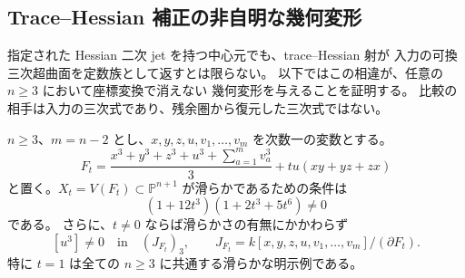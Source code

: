 \subsection{Trace--Hessian 補正の非自明な幾何変形}
\label{sec:trace-geometric-correction}

指定された Hessian 二次 jet を持つ中心元でも、trace--Hessian 射が
入力の可換三次超曲面を定数族として返すとは限らない。
以下ではこの相違が、任意の $n\ge3$ において座標変換で消えない
幾何変形を与えることを証明する。
比較の相手は入力の三次式であり、残余圏から復元した三次式ではない。

\begin{proposition}
\label{prop:trace-uniform-jacobi-class}
$n\ge3$、$m=n-2$ とし、$x,y,z,u,v_1,\ldots,v_m$ を次数一の変数とする。
\begin{equation}\label{eq:trace-test-family}
 F_t=\frac{x^3+y^3+z^3+u^3+\sum_{a=1}^{m}v_a^3}{3}
       +tu(xy+yz+zx)
\end{equation}
と置く。$X_t=V(F_t)\subset\mathbb P^{n+1}$ が滑らかであるための条件は
\begin{equation}\label{eq:trace-test-smooth}
 (1+12t^3)(1+2t^3+5t^6)\ne0
\end{equation}
である。
さらに、$t\ne0$ ならば滑らかさの有無にかかわらず
\begin{equation}\label{eq:trace-u-cube-nonzero}
 [u^3]\ne0\quad\text{in}\quad
 (J_{F_t})_3,
 \qquad
 J_{F_t}=k[x,y,z,u,v_1,\ldots,v_m]/(\partial F_t).
\end{equation}
特に $t=1$ は全ての $n\ge3$ に共通する滑らかな明示例である。
\end{proposition}

